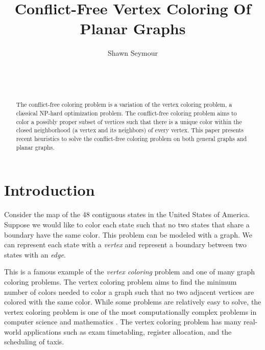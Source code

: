 \documentclass{sig-alternate}
\begin{document}

\title{Conflict-Free Vertex Coloring Of Planar Graphs}


\author{
\alignauthor
Shawn Seymour\\
	\\
	\\
	\\
}

\maketitle
\begin{abstract}
The conflict-free coloring problem is a variation of the vertex coloring problem, a classical NP-hard optimization problem. The conflict-free coloring problem aims to color a possibly proper subset of vertices such that there is a unique color within the closed neighborhood (a vertex and its neighbors) of every vertex. This paper presents recent heuristics to solve the conflict-free coloring problem on both general graphs and planar graphs.
\end{abstract}

\section{Introduction}
\label{sec:introduction}

Consider the map of the 48 contiguous states in the United States of America. Suppose we would like to color each state such that no two states that share a boundary have the same color. This problem can be modeled with a graph. We can represent each state with a \emph{vertex} and represent a boundary between two states with an \emph{edge}.

This is a famous example of the \emph{vertex coloring} problem and one of many graph coloring problems. The vertex coloring problem aims to find the minimum number of colors needed to color a graph such that no two adjacent vertices are colored with the same color. While some problems are relatively easy to solve, the vertex coloring problem is one of the most computationally complex problems in computer science and mathematics \cite{bondy1976graph}. The vertex coloring problem has many real-world applications such as exam timetabling, register allocation, and the scheduling of taxis.
\end{document}
